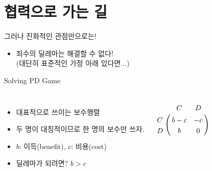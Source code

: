 \documentclass[final]{beamer}
\begin{document}

\section{협력으로 가는 길} %
\label{sec:Road_to_Cooperation}

\begin{frame}[t]{그러나 진화적인 관점만으로는!}
	\begin{itemize}
	\item 죄수의 딜레마는 해결할 수 없다! \\(대단히 표준적인 가정 아래 있다면...)
	\end{itemize}
	\begin{center}
	\end{center}
\end{frame}

\begin{frame}[t]{Solving PD Game}
	\begin{columns}[c]
		\column{20em}
		\begin{itemize}
		\item 대표적으로 쓰이는 보수행렬
		\item 두 명이 대칭적이므로 한 명의 보수만 쓰자.
		\item $b$: 이득(benefit), $c$: 비용(cost) 
		\item 딜레마가 되려면? $b>c$
		\end{itemize}
		\column{15em}
		\begin{align*}
		\bordermatrix{%
		   & C & D \cr
		C & b-c & -c  \cr
		D & b & 0  \cr
		}
		\end{align*}
	\end{columns}
\end{frame}
\end{document}
